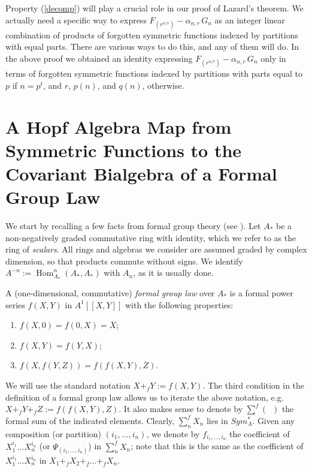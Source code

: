 \documentclass[a4paper,12pt]{amsart}
\theoremstyle{definition}
\numberwithin{equation}{section}
\newcommand{\Hom}{\operatorname{Hom}}
\newcommand{\ab}{\overline{A}_* }
\newcommand{\sla}{Sym_A^* }
\begin{document}
Property (\ref{decomp}) will play a crucial role in our proof of Lazard's theorem. We actually need a specific way to express $F_{(r^{n/r})}-\alpha_{n,r}\,G_n$ as an integer linear combination of products of forgotten symmetric functions indexed by partitions with equal parts. There are various ways to do this, and any of them will do. In the above proof we obtained an identity expressing $F_{(r^{n/r})}-\alpha_{n,r}\,G_n$ only in terms of forgotten symmetric functions indexed by partitions with parts equal to $p$ if $n=p^t$, and $r$, $p(n)$, and $q(n)$, otherwise.

\section{A Hopf Algebra Map from Symmetric Functions to the Covariant Bialgebra of a Formal Group Law}
 
We start by recalling a few facts from formal group theory (see \cite{hazfga}). Let $A_*$ be a non-negatively
graded commutative ring with identity, which we refer to as the ring
of {\em scalars}. 
All rings and algebras we consider are assumed
graded by complex dimension, so that products commute without signs. We identify $A^{-n}:=\Hom_{A_*}^{n}(A_*,A_*)$ with $A_n$, as it is usually done.

A (one-dimensional, commutative) {\em formal group law} over $A_*$ is a formal power series $f(X,Y)$ in $A^1[[X,Y]]$ with the following properties:
\begin{enumerate}
\item $f(X,0)=f(0,X)=X$;
\item $f(X,Y)=f(Y,X)$;
\item $f(X,f(Y,Z))=f(f(X,Y),Z)$.
\end{enumerate}
We will use the standard notation $X+_fY:=f(X,Y)$. The third condition in the definition of a formal group law allows us to iterate the above notation, e.g. $X+_fY+_fZ:=f(f(X,Y),Z)$. It also makes sense to denote by $\sum^f(\;\:)$ the formal sum of the indicated elements. Clearly, $\sum_n^f X_n$ lies in $\sla$. Given any composition (or partition) $(i_1,\ldots,i_n)$, we denote by $f_{i_1,\ldots,i_n}$ the coefficient of $X_1^{i_1}\ldots X_n^{i_n}$ (or $\varPsi_{(i_1,\ldots,i_n)}$) in $\sum_n^f X_n$; note that this is the same as the coefficient of $X_1^{i_1}\ldots X_n^{i_n}$ in $X_1+_fX_2+_f\ldots+_fX_{n}$.
\end{document}
